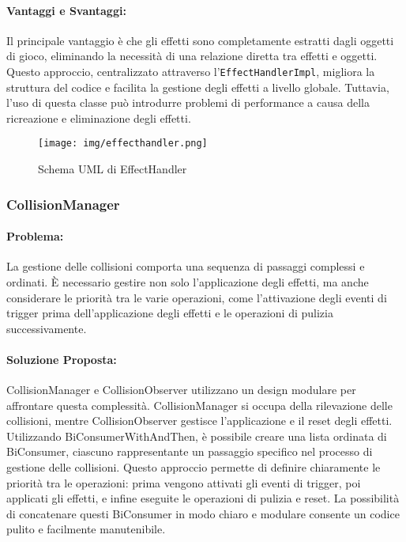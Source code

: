 \documentclass[a4paper,12pt]{report}
\begin{document}
	\paragraph{Vantaggi e Svantaggi:}
	Il principale vantaggio è che gli effetti sono completamente estratti dagli oggetti di gioco, eliminando la necessità di una relazione diretta tra effetti e oggetti. Questo approccio, centralizzato attraverso l’\texttt{EffectHandlerImpl}, migliora la struttura del codice e facilita la gestione degli effetti a livello globale. Tuttavia, l’uso di questa classe può introdurre problemi di performance a causa della ricreazione e eliminazione degli effetti.
	
	\begin{figure}[H]
		\centering
		\texttt{[image: img/effecthandler.png]}
		\caption{Schema UML di EffectHandler}
		\label{img:effecthandler}
	\end{figure}
	
	\subsubsection{CollisionManager}
	\paragraph{Problema:} La gestione delle collisioni comporta una sequenza di passaggi complessi e ordinati. È necessario gestire non solo l’applicazione degli effetti, ma anche considerare le priorità tra le varie operazioni, come l’attivazione degli eventi di trigger prima dell’applicazione degli effetti e le operazioni di pulizia successivamente. 
	\paragraph{Soluzione Proposta:}  CollisionManager e CollisionObserver utilizzano un design modulare per affrontare questa complessità. CollisionManager si occupa della rilevazione delle collisioni, mentre CollisionObserver gestisce l’applicazione e il reset degli effetti. Utilizzando BiConsumerWithAndThen, è possibile creare una lista ordinata di BiConsumer, ciascuno rappresentante un passaggio specifico nel processo di gestione delle collisioni. Questo approccio permette di definire chiaramente le priorità tra le operazioni: prima vengono attivati gli eventi di trigger, poi applicati gli effetti, e infine eseguite le operazioni di pulizia e reset. La possibilità di concatenare questi BiConsumer in modo chiaro e modulare consente un codice pulito e facilmente manutenibile.
\end{document}
